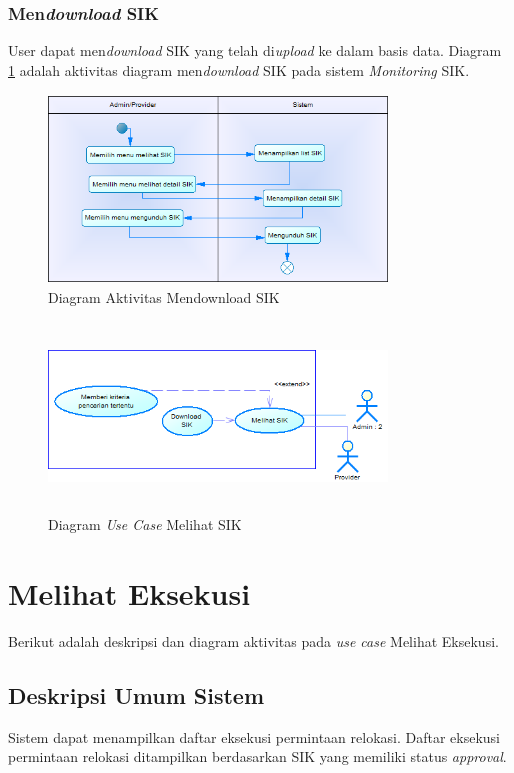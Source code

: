 	\subsubsection{Men\textit{download} SIK}
	User dapat men\textit{download} SIK yang telah di\textit{upload} ke dalam basis data. Diagram \ref{figure:activity_mendownload_sik} adalah aktivitas diagram men\textit{download} SIK pada sistem \textit{Monitoring} SIK.
	\begin{figure}[h]
	\centerline
	{\includegraphics[width=9cm,height=5cm]{bab4/ActivityDiagram_DownloadSIK.png}}
	\caption{Diagram Aktivitas Mendownload SIK}
	\label{figure:activity_mendownload_sik}
	\end{figure}

	\begin{figure}[h]
	\centerline
	{\includegraphics[width=9cm,height=5cm]{bab4/use-case-melihat-sik.png}}
	\caption{Diagram \textit{Use Case} Melihat SIK}
	\label{figure:use_case_melihat_sik}
	\end{figure}
	
\section{Melihat Eksekusi}
Berikut adalah deskripsi dan diagram aktivitas pada \textit{use case} Melihat Eksekusi.
\subsection{Deskripsi Umum Sistem}
\tab Sistem dapat menampilkan daftar eksekusi permintaan relokasi. Daftar eksekusi permintaan relokasi ditampilkan berdasarkan SIK yang memiliki status \textit{approval}.
